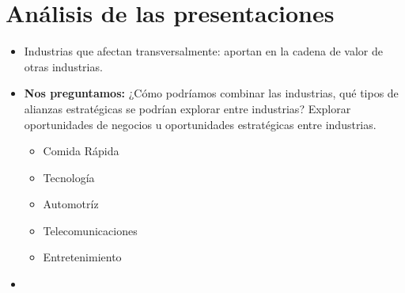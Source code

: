 \section{Análisis de las presentaciones}
\begin{itemize}
    \item Industrias que afectan transversalmente: aportan en la cadena de valor de otras industrias.
    \item \textbf{Nos preguntamos:} ¿Cómo podríamos combinar las industrias, qué tipos de alianzas estratégicas se podrían explorar entre industrias? Explorar oportunidades de negocios u oportunidades estratégicas entre industrias.
        \begin{itemize}
            \item Comida Rápida 
            \item Tecnología 
            \item Automotríz 
            \item Telecomunicaciones
            \item Entretenimiento 
        \end{itemize}
    
    \item 
\end{itemize}
